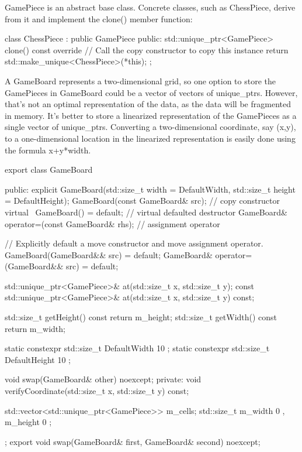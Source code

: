 GamePiece is an abstract base class. Concrete classes, such as ChessPiece, derive from it and implement the clone() member function:

\begin{cpp}
class ChessPiece : public GamePiece
{
    public:
        std::unique_ptr<GamePiece> clone() const override
        {
            // Call the copy constructor to copy this instance
            return std::make_unique<ChessPiece>(*this);
        }
};
\end{cpp}

A GameBoard represents a two-dimensional grid, so one option to store the GamePieces in GameBoard could be a vector of vectors of unique\_ptrs. However, that’s not an optimal representation of the data, as the data will be fragmented in memory. It’s better to store a linearized representation of the GamePieces as a single vector of unique\_ptrs. Converting a two-dimensional coordinate, say (x,y), to a one-dimensional location in the linearized representation is easily done using the formula x+y*width.

\begin{cpp}
export class GameBoard
{
    public:
        explicit GameBoard(std::size_t width = DefaultWidth,
            std::size_t height = DefaultHeight);
        GameBoard(const GameBoard& src); // copy constructor
        virtual ~GameBoard() = default; // virtual defaulted destructor
        GameBoard& operator=(const GameBoard& rhs); // assignment operator

        // Explicitly default a move constructor and move assignment operator.
        GameBoard(GameBoard&& src) = default;
        GameBoard& operator=(GameBoard&& src) = default;

        std::unique_ptr<GamePiece>& at(std::size_t x, std::size_t y);
        const std::unique_ptr<GamePiece>& at(std::size_t x, std::size_t y) const;

        std::size_t getHeight() const { return m_height; }
        std::size_t getWidth() const { return m_width; }

        static constexpr std::size_t DefaultWidth { 10 };
        static constexpr std::size_t DefaultHeight { 10 };

        void swap(GameBoard& other) noexcept;
    private:
        void verifyCoordinate(std::size_t x, std::size_t y) const;

        std::vector<std::unique_ptr<GamePiece>> m_cells;
        std::size_t m_width { 0 }, m_height { 0 };
};
export void swap(GameBoard& first, GameBoard& second) noexcept;
\end{cpp}

